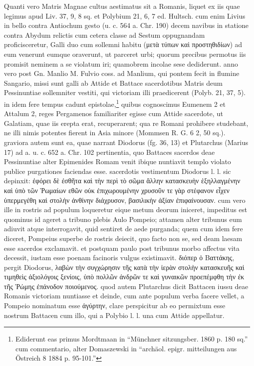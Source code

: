 \documentclass[a4paper, 11pt, oneside, polutonikogreek, german, twocolumn]{article}
\begin{document}
Quanti vero Matris Magnae cultus aestimatus sit a Romanis, liquet ex iis quae legimus apud Liv. 37, 9, 8 sq. et Polybium 21, 6, 7 ed. Hultsch. cum enim Livius in bello contra Antiochum gesto (u. c. 564 a. Chr. 190) decem navibus in statione contra Abydum relictis cum cetera classe ad Sestum oppugnandam proficisceretur, Galli duo cum sollemni habitu (μετὰ τύπων καὶ προστηθιδίων) ad eum venerunt eumque oraverunt, ut parceret urbi; quorum precibus permotus iis promisit neminem a se violatum iri; quamobrem incolae sese dediderunt. anno vero post Gn. Manlio M. Fulvio coss. ad Manlium, qui pontem fecit in flumine Sangario, missi sunt galli ab Attide et Battace sacerdotibus Matris deum Pessinuntiae sollemniter vestiti, qui victoriam illi praedicerent (Polyb. 21, 37, 5). in idem fere tempus cadunt epistolae,\footnote{Ediderunt eas primus Mordtmaan in "`Münchner sitzungsber. 1860 p. 180 sq."' cum commentario, alter Domaszewski in "`archäol. epigr. mitteilungen aus Östreich 8 1884 p. 95-101."'} quibus cognoscimus Eumenem 2 et Attalum 2, reges Pergamenos familiariter egisse cum Attide sacerdote, ut Galatiam, quae iis erepta erat, recuperarent; qua re Romani prohibere studebant, ne illi nimis potentes fierent in Asia minore (Mommsen R. G. 6 2, 50 sq.). graviora autem sunt ea, quae narrant Diodorus (fg. 36, 13) et Plutarchus (Marius 17) ad a. u. c. 652 a. Chr. 102 pertinentia, quo Battaces sacerdos deae Pessinuntiae alter Epimenides Romam venit ibique nuntiavit templo violato publice purgationes faciendas esse. sacerdotis vestimentum Diodorus l. l. sic depinxit: ἐφόρει δὲ ἐσθῆτα καὶ τὴν περὶ τὸ σῶμα ἄλλην κατασκευὴν ἑξηλλαγμένην καὶ ὑπὸ τῶν Ῥωμαίων εθῶν οὐκ ἐπιχωρουμένην χρυσοῦν τε γὰρ στέφανον εἶχεν ὑπερμεγέθη καὶ στολὴν ἀνθίνην διάχρυσον, βασιλικὴν ἀξίαν ἐπιφαίνουσαν. cum vero ille in rostris ad populum loqueretur eique metum deorum iniceret, impeditus est quominus id ageret a tribuno plebis Aulo Pompeio; attamen alter tribunus eum adiuvit atque interrogavit, quid sentiret de aede purganda; quem cum idem fere diceret, Pompeius superbe de rostris deiecit, quo facto non se, sed deam laesam esse sacerdos exclamavit. et postquam paulo post tribunus morbo affectus vita decessit, iustam esse poenam facinoris vulgus existimavit. διόπερ ὁ Βαττάκης, pergit Diodorus, λαβὼν τὴν συγχώρησιν τῆς κατὰ τὴν ἱερὰν στολὴν κατασκευῆς καὶ τιμηθεὶς ἀξιολόγοις ξενίοις, ὑπὸ πολλῶν ἀνδρῶν τε καὶ γυναικῶν προεπέμφθη τὴν ἐκ τῆς Ῥώμης ἐπάνοδον ποιούμενος. quod autem Plutarchus dicit Battacen iussu deae Romanis victoriam nuntiasse et deinde, cum ante populum verba facere vellet, a Pompeio nominatum esse ἀγύρτην, clare perspicitur ab eo permixtum esse nostrum Battacen cum illo, qui a Polybio l. l. una cum Attide appellatur.
\end{document}
